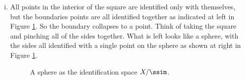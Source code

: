 \begin{enumerate}[i.]

	\item  All points in the interior of the square are identified only with themselves, but the boundaries points are all identified together as indicated at left in Figure \ref{F:Quotient_sphere}. So the boundary collapses to a point. Think of taking the square and pinching all of the sides together. What is left looks like a sphere, with the sides all identified with a single point on the sphere as shown at right in Figure \ref{F:Quotient_sphere}. %
\begin{figure}[h]
\begin{center}
 \hspace{0.75in}  
\caption{A sphere as the identification space $X/\ssim$.} 
\label{F:Quotient_sphere}
\end{center}
\end{figure}

	\end{enumerate}
	
